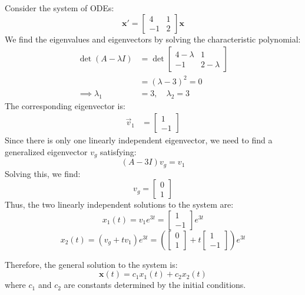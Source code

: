 \documentclass[11pt]{article}
\begin{document}
\begin{example}
    Consider the system of ODEs:
    $$
    \textbf{x}' = \begin{bmatrix} 4 & 1 \\ -1 & 2
    \end{bmatrix}\textbf{x}
    $$
    We find the eigenvalues and eigenvectors by solving the characteristic polynomial:
    \begin{align*}
    \det(A - \lambda I) &= \det\begin{bmatrix} 4 - \lambda & 1 \\ -1 & 2 - \lambda
    \end{bmatrix} \\
    &= (\lambda - 3)^2 = 0 \\
    \implies \lambda_1 &= 3, \quad \lambda_2 = 3
    \end{align*}
    The corresponding eigenvector is:
    \begin{align*}
    \vec{v}_1 &= \begin{bmatrix} 1 \\ -1
    \end{bmatrix}
    \end{align*}
    Since there is only one linearly independent eigenvector, we need to find a generalized eigenvector \( v_g \) satisfying:
    $$
    (A - 3I)v_g = v_1
    $$
    Solving this, we find:
    $$
    v_g = \begin{bmatrix} 0 \\ 1
    \end{bmatrix}
    $$
    Thus, the two linearly independent solutions to the system are:
    $$x_1(t) = v_1 e^{3t} = \begin{bmatrix} 1 \\ -1
    \end{bmatrix} e^{3t}$$
    $$x_2(t) = (v_g + tv_1)e^{3t} = \left(\begin{bmatrix} 0 \\ 1
    \end{bmatrix} + t\begin{bmatrix} 1 \\ -1
    \end{bmatrix}\right)e^{3t}$$
    
    Therefore, the general solution to the system is:
    $$\textbf{x}(t) = c_1 x_1(t) + c_2 x_2(t)$$
    where \( c_1 \) and \( c_2 \) are constants determined by the initial conditions.
\end{example}
\end{document}
